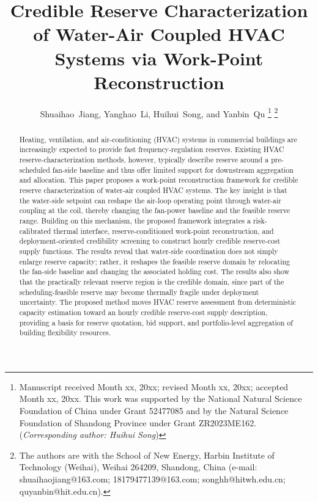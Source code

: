\documentclass[journal]{IEEEtran}
\theoremstyle{remark}
\begin{document}
	\title{Credible Reserve Characterization of Water-Air Coupled HVAC Systems via Work-Point Reconstruction}
	
	
	
	
	\author{Shuaihao~Jiang,
		Yanghao~Li,
		Huihui~Song,
		and Yanbin~Qu%
		\thanks{Manuscript received Month xx, 20xx; revised Month xx, 20xx; accepted Month xx, 20xx. This work was supported by the National Natural Science Foundation of China under Grant 52477085 and by the Natural Science Foundation of Shandong Province under Grant ZR2023ME162. (\textit{Corresponding author: Huihui Song})}%
		\thanks{The authors are with the School of New Energy, Harbin Institute of Technology (Weihai), Weihai 264209, Shandong, China (e-mail: shuaihaojiang@163.com; 18179477139@163.com; songhh@hitwh.edu.cn; quyanbin@hit.edu.cn).}%
	}
	
	
	
	
	\maketitle
	
	\begin{abstract}
		Heating, ventilation, and air-conditioning (HVAC) systems in commercial buildings are increasingly expected to provide fast frequency-regulation reserves. Existing HVAC reserve-characterization methods, however, typically describe reserve around a pre-scheduled fan-side baseline and thus offer limited support for downstream aggregation and allocation. This paper proposes a work-point reconstruction framework for credible reserve characterization of water-air coupled HVAC systems. The key insight is that the water-side setpoint can reshape the air-loop operating point through water-air coupling at the coil, thereby changing the fan-power baseline and the feasible reserve range. Building on this mechanism, the proposed framework integrates a risk-calibrated thermal interface, reserve-conditioned work-point reconstruction, and deployment-oriented credibility screening to construct hourly credible reserve-cost supply functions. The results reveal that water-side coordination does not simply enlarge reserve capacity; rather, it reshapes the feasible reserve domain by relocating the fan-side baseline and changing the associated holding cost. The results also show that the practically relevant reserve region is the credible domain, since part of the scheduling-feasible reserve may become thermally fragile under deployment uncertainty. The proposed method moves HVAC reserve assessment from deterministic capacity estimation toward an hourly credible reserve-cost supply description, providing a basis for reserve quotation, bid support, and portfolio-level aggregation of building flexibility resources.
	\end{abstract}
	
\end{document}
